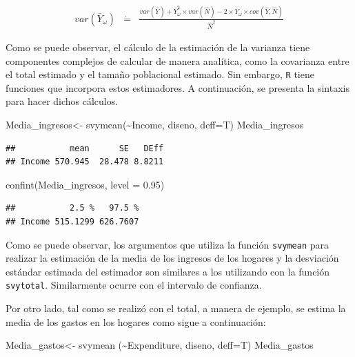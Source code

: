 \documentclass[
  12pt,
]{book}
\newenvironment{Shaded}{\begin{snugshade}}{\end{snugshade}}
\newcommand{\AttributeTok}[1]{\textcolor[rgb]{0.77,0.63,0.00}{#1}}
\newcommand{\FloatTok}[1]{\textcolor[rgb]{0.00,0.00,0.81}{#1}}
\newcommand{\FunctionTok}[1]{\textcolor[rgb]{0.00,0.00,0.00}{#1}}
\newcommand{\NormalTok}[1]{#1}
\newcommand{\OtherTok}[1]{\textcolor[rgb]{0.56,0.35,0.01}{#1}}
\newcommand{\SpecialCharTok}[1]{\textcolor[rgb]{0.00,0.00,0.00}{#1}}
\begin{document}
\begin{eqnarray*}
var\left(\bar{Y}_{\omega}\right) & \dot{=} & \frac{var\left(\hat{Y}\right)+\bar{Y}_{\omega}^{2}\times var\left(\hat{N}\right)-2\times\bar{Y}_{\omega}\times cov\left(\hat{Y},\hat{N}\right)}{\hat{N}^{2}}
\end{eqnarray*}

Como se puede observar, el cálculo de la estimación de la varianza tiene componentes complejos de calcular de manera analítica, como la covarianza entre el total estimado y el tamaño poblacional estimado. Sin embargo, \texttt{R} tiene funciones que incorpora estos estimadores. A continuación, se presenta la sintaxis para hacer dichos cálculos.

\begin{Shaded}
\begin{Highlighting}[]
\NormalTok{Media\_ingresos}\OtherTok{\textless{}{-}} \FunctionTok{svymean}\NormalTok{(}\SpecialCharTok{\textasciitilde{}}\NormalTok{Income, diseno, }\AttributeTok{deff=}\NormalTok{T) }
\NormalTok{Media\_ingresos}
\end{Highlighting}
\end{Shaded}

\begin{verbatim}
##           mean      SE   DEff
## Income 570.945  28.478 8.8211
\end{verbatim}

\begin{Shaded}
\begin{Highlighting}[]
\FunctionTok{confint}\NormalTok{(Media\_ingresos, }\AttributeTok{level =} \FloatTok{0.95}\NormalTok{)}
\end{Highlighting}
\end{Shaded}

\begin{verbatim}
##           2.5 %   97.5 %
## Income 515.1299 626.7607
\end{verbatim}

Como se puede observar, los argumentos que utiliza la función \texttt{svymean} para realizar la estimación de la media de los ingresos de los hogares y la desviación estándar estimada del estimador son similares a los utilizando con la función \texttt{svytotal}. Similarmente ocurre con el intervalo de confianza.

Por otro lado, tal como se realizó con el total, a manera de ejemplo, se estima la media de los gastos en los hogares como sigue a continuación:

\begin{Shaded}
\begin{Highlighting}[]
\NormalTok{Media\_gastos}\OtherTok{\textless{}{-}} \FunctionTok{svymean}\NormalTok{ (}\SpecialCharTok{\textasciitilde{}}\NormalTok{Expenditure, diseno, }\AttributeTok{deff=}\NormalTok{T)}
\NormalTok{Media\_gastos}
\end{Highlighting}
\end{Shaded}
\end{document}
